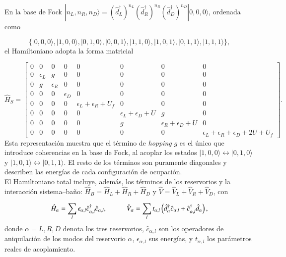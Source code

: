 En la base de Fock $|n_{L},n_{R},n_{D} \rangle = (\hat{d}^{\dagger}_{L})^{n_{L}}(\hat{d}^{\dagger}_{R})^{n_{R}}(\hat{d}^{\dagger}_{D})^{n_{D}}|0,0,0\rangle$, ordenada como

\begin{equation*}
     \{|0,0,0\rangle, |1,0,0\rangle, |0,1,0\rangle, |0,0,1\rangle, |1,1,0\rangle, |1,0,1\rangle, |0,1,1\rangle, |1,1,1\rangle\},
\end{equation*}
el Hamiltoniano adopta la forma matricial 

\begin{equation*}
    \hat{H}_{S} = 
    \begin{bmatrix}
        0 & 0 & 0 & 0 & 0 & 0 & 0 & 0 \\
        0 & \epsilon_{L} & g & 0 & 0 & 0 & 0 & 0 \\
        0 & g & \epsilon_{R} & 0 & 0 & 0 & 0 & 0 \\
        0 & 0 & 0 & \epsilon_{D} & 0 & 0 & 0 & 0 \\
        0 & 0 & 0 & 0 & \epsilon_{L} + \epsilon_{R}  + U_{f} & 0 & 0 & 0 \\
        0 & 0 & 0 & 0 & 0 & \epsilon_{L} + \epsilon_{D} + U & g & 0 \\
        0 & 0 & 0 & 0 & 0 & g & \epsilon_{R} + \epsilon_{D} + U & 0 \\
        0 & 0 & 0 & 0 & 0 & 0 & 0 & \epsilon_{L} + \epsilon_{R}  + \epsilon_{D} + 2U + U_{f} 
        \end{bmatrix}.
\end{equation*}
Esta representación muestra que el término de \textit{hopping} $g$ es el único que introduce coherencias en la base de Fock, al acoplar los estados $|1,0,0\rangle \leftrightarrow |0,1,0\rangle$ y $|1,0,1\rangle \leftrightarrow |0,1,1\rangle$. El resto de los términos son puramente diagonales y describen las energías de cada configuración de ocupación.
\\

El Hamiltoniano total incluye, además, los términos de los reservorios y la interacción sistema–baño: $\hat{H}_{B} = \hat{H}_{L}+\hat{H}_{R}+\hat{H}_{D}$ y $\hat{V} = \hat{V}_{L}+\hat{V}_{R}+\hat{V}_{D}$, con 

\begin{equation*}
    \hat{H}_{\alpha} = \sum_{l} \epsilon_{\alpha, l} \hat{c}^{\dagger}_{\alpha, l}\hat{c}_{\alpha, l}, \hspace{10mm} 
    \hat{V}_{\alpha} = \sum_{l} t_{\alpha, l} \left( \hat{d}^{\dagger}_{\alpha} \hat{c}_{\alpha, l} + \hat{c}^{\dagger}_{\alpha, l} \hat{d}_{\alpha} \right),
\end{equation*}
donde $\alpha = L,R,D$ denota los tres reservorios, $\hat{c}_{\alpha,l}$ son los operadores de aniquilación de los modos del reservorio $\alpha$, $\epsilon_{\alpha, l}$ sus energías, y $t_{\alpha, l}$ los parámetros reales de acoplamiento. 
\\

